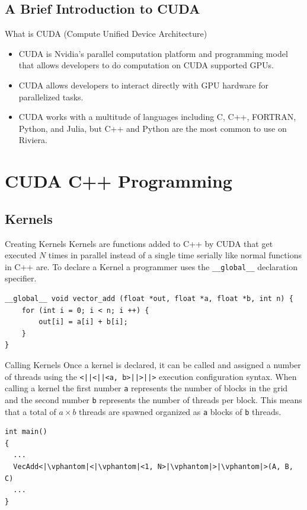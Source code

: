\documentclass[aspectratio=169]{beamer}
\begin{document}
\subsection{A Brief Introduction to CUDA}

\begin{frame}{What is CUDA (Compute Unified Device Architecture)}
	\begin{itemize}
		\item CUDA is Nvidia's parallel computation platform and programming model that allows developers to do computation on CUDA supported GPUs.
		\item CUDA allows developers to interact directly with GPU hardware for parallelized tasks.
		\item CUDA works with a multitude of languages including C, C++, FORTRAN, Python, and Julia, but C++ and Python are the most common to use on Riviera.
	\end{itemize}
\end{frame}

\section{CUDA C++ Programming}
\subsection{Kernels}
\begin{frame}[fragile]{Creating Kernels}
	Kernels are functions added to C++ by CUDA that get executed \(N\) times in parallel instead of a single time serially like normal functions in C++ are. To declare a Kernel a programmer uses the \texttt{__global__} declaration specifier.

	\begin{verbatim}
__global__ void vector_add (float *out, float *a, float *b, int n) {
    for (int i = 0; i < n; i ++) {
        out[i] = a[i] + b[i];
    }
}
    \end{verbatim}

\end{frame}

\begin{frame}[fragile]{Calling Kernels}
Once a kernel is declared, it can be called and assigned a number of threads using the \texttt{<|\vphantom{}|<|\vphantom{}|<a, b>|\vphantom{}|>|\vphantom{}|>} execution configuration syntax. When calling a kernel the first number \texttt{a} represents the number of blocks in the grid and the second number \texttt{b} represents the number of threads per block. This means that a total of \(a \times b\) threads are spawned organized as \texttt{a} blocks of \texttt{b} threads.

	\begin{verbatim}
int main()
{
  ...
  VecAdd<|\vphantom|<|\vphantom|<1, N>|\vphantom|>|\vphantom|>(A, B, C)
  ...
}
  \end{verbatim}
\end{frame}
\end{document}
